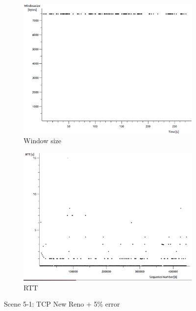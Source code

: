 \documentclass[conference,a4paper]{../../sty/IEEEtran}
\begin{document}
\begin{figure}
\begin{subfigure}[b]{0.2\textwidth}
  \includegraphics[width=\textwidth]{s5-1_wsize}
  \caption{Window size}
 \end{subfigure}
 \begin{subfigure}[b]{0.2\textwidth}
  \includegraphics[width=\textwidth]{s5-1_rtt}
  \caption{RTT}
 \end{subfigure}
 \caption{Scene 5-1: TCP New Reno + 5\% error}
\end{figure}
\end{document}
